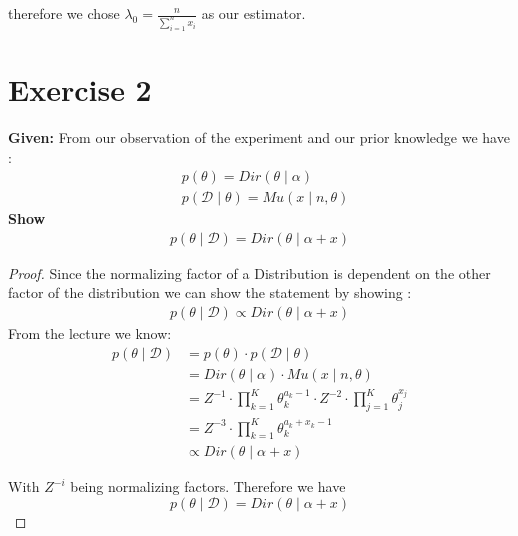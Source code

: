 \documentclass{article}
\begin{document}
therefore we chose $\lambda_0 =  \frac{n}{\sum_{i=1}^n x_i}$ as our estimator.
\section*{Exercise 2}
\textbf{Given:} From our observation of the experiment and our prior knowledge we have :
\begin{align*}
    &p(\theta) = Dir(\theta \mid \alpha) \\
    &p( \mathcal{D} \mid \theta) = Mu(x \mid n,\theta)
\end{align*}
\textbf{Show} 
\begin{align*}
    p(\theta \mid \mathcal{D}) = Dir(\theta \mid \alpha+x)
\end{align*}

\begin{proof}
    Since the normalizing factor of a Distribution is dependent on the other factor of the distribution we can show the statement by showing :
    \begin{align*}
        p(\theta \mid \mathcal{D}) 	\propto Dir(\theta \mid \alpha + x)
    \end{align*}
From the lecture we know:
\begin{align*}
    p(\theta \mid \mathcal{D})  &= p(\theta) \cdot p( \mathcal{D} \mid \theta) \\
                                &= Dir(\theta \mid \alpha) \cdot Mu(x \mid n,\theta) \\
                                &= Z^{-1} \cdot \prod_{k=1}^K \theta_k^{a_k-1} \cdot Z^{-2} \cdot \prod_{j=1}^K \theta_j^{x_j}\\
                                &= Z^{-3}  \cdot \prod_{k=1}^K \theta_k^{a_k + x_k-1}\\
                                &\propto Dir(\theta \mid \alpha + x)
\end{align*}

With $Z^{-i}$  being normalizing factors. Therefore we have    
\[
     p(\theta \mid \mathcal{D}) = Dir(\theta \mid \alpha+x)
    \]
\end{proof}
\end{document}
